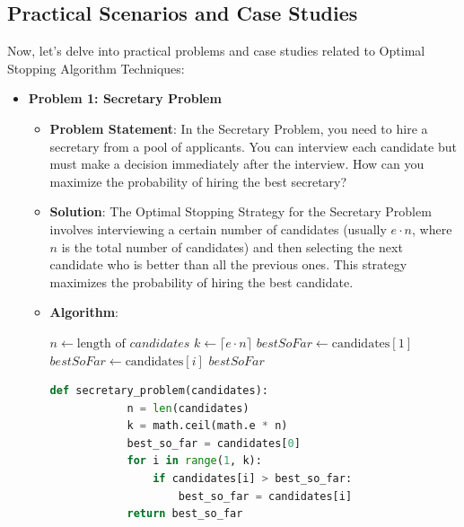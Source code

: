 \documentclass[12pt]{book} %
\begin{document}
\subsection{Practical Scenarios and Case Studies}
Now, let's delve into practical problems and case studies related to Optimal Stopping Algorithm Techniques:

\begin{itemize}
    \item \textbf{Problem 1: Secretary Problem}
    \begin{itemize}
        \item \textbf{Problem Statement}: In the Secretary Problem, you need to hire a secretary from a pool of applicants. You can interview each candidate but must make a decision immediately after the interview. How can you maximize the probability of hiring the best secretary?
        \item \textbf{Solution}: The Optimal Stopping Strategy for the Secretary Problem involves interviewing a certain number of candidates (usually $e \cdot n$, where $n$ is the total number of candidates) and then selecting the next candidate who is better than all the previous ones. This strategy maximizes the probability of hiring the best candidate.
        \item \textbf{Algorithm}:
        \begin{algorithm}[H]
        \caption{Optimal Stopping for Secretary Problem}
        \begin{algorithmic}[1]
            \State $n \gets \text{length of } candidates$
            \State $k \gets \lceil e \cdot n \rceil$ 
            \State $bestSoFar \gets \text{candidates}[1]$
                    \State $bestSoFar \gets \text{candidates}[i]$
                \EndIf
            \EndFor
            \State \Return $bestSoFar$
        \EndFunction
        \end{algorithmic}
        \end{algorithm}
        \FloatBarrier
        \begin{lstlisting}[language=Python]
        def secretary_problem(candidates):
            n = len(candidates)
            k = math.ceil(math.e * n)
            best_so_far = candidates[0]
            for i in range(1, k):
                if candidates[i] > best_so_far:
                    best_so_far = candidates[i]
            return best_so_far
        \end{lstlisting}
        \FloatBarrier
    \end{itemize}
    

\end{itemize}
\end{document}
